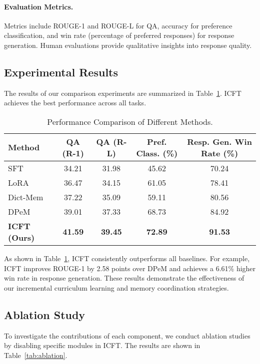 \paragraph{Evaluation Metrics.}
Metrics include ROUGE-1 and ROUGE-L for QA, accuracy for preference classification, and win rate (percentage of preferred responses) for response generation. Human evaluations provide qualitative insights into response quality.

\subsection{Experimental Results}

The results of our comparison experiments are summarized in Table~\ref{tab:main_results}. ICFT achieves the best performance across all tasks.

\begin{table}[ht]\small
\centering
\caption{Performance Comparison of Different Methods.}
\label{tab:main_results}
\begin{tabular}{lcccc}
\toprule
\textbf{Method} & \textbf{QA (R-1)} & \textbf{QA (R-L)} & \textbf{Pref. Class. (\%)} & \textbf{Resp. Gen. Win Rate (\%)} \\
\midrule
SFT               & 34.21 & 31.98 & 45.62 & 70.24 \\
LoRA              & 36.47 & 34.15 & 61.05 & 78.41 \\
Dict-Mem          & 37.22 & 35.09 & 59.11 & 80.56 \\
DPeM              & 39.01 & 37.33 & 68.73 & 84.92 \\
\textbf{ICFT (Ours)} & \textbf{41.59} & \textbf{39.45} & \textbf{72.89} & \textbf{91.53} \\
\bottomrule
\end{tabular}
\end{table}

As shown in Table~\ref{tab:main_results}, ICFT consistently outperforms all baselines. For example, ICFT improves ROUGE-1 by 2.58 points over DPeM and achieves a 6.61\% higher win rate in response generation. These results demonstrate the effectiveness of our incremental curriculum learning and memory coordination strategies.

\subsection{Ablation Study}

To investigate the contributions of each component, we conduct ablation studies by disabling specific modules in ICFT. The results are shown in Table~\ref{tab:ablation}.

